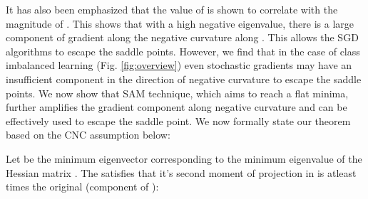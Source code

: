 \documentclass{article}
\begin{document}
\vspace{-0.5em}
It has also been emphasized that the value of  is shown to correlate with the magnitude of . This shows that with a high negative eigenvalue, there is a large component of gradient along the negative curvature along . This allows the SGD algorithms to escape the saddle points. However, we find that in the case of class imbalanced learning (Fig. \ref{fig:overview}) even stochastic gradients may have an insufficient component in the direction of negative curvature to escape the saddle points. We now show that SAM technique, which aims to reach a flat minima, further amplifies the gradient component along negative curvature and can be effectively used to escape the saddle point. We now formally state our theorem based on the CNC assumption below:
\begin{theorem}
\label{th:sam_rho}
Let  be the minimum eigenvector corresponding to the minimum eigenvalue  of the Hessian matrix . The  satisfies that it's second moment of projection in  is atleast  times the original (component of ): 

\end{theorem}
\end{document}
